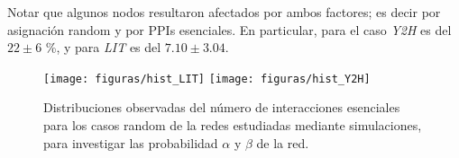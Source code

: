 Notar que algunos nodos resultaron afectados por ambos factores; es decir por asignaci\'on random y por PPIs esenciales. 
En particular, para el caso {\it Y2H} es del $22 \pm 6$ \%, y para {\it LIT} es del $7.10 \pm 3.04$.

\begin{figure}
\centering
\texttt{[image: figuras/hist\_LIT]} 
\texttt{[image: figuras/hist\_Y2H]} \\
\caption{Distribuciones observadas del n\'umero de interacciones esenciales para los casos random de la redes estudiadas mediante simulaciones, para investigar las probabilidad $\alpha$ y $\beta$ de la red.}
\label{fig:remocion_alternativo}
\end{figure}

